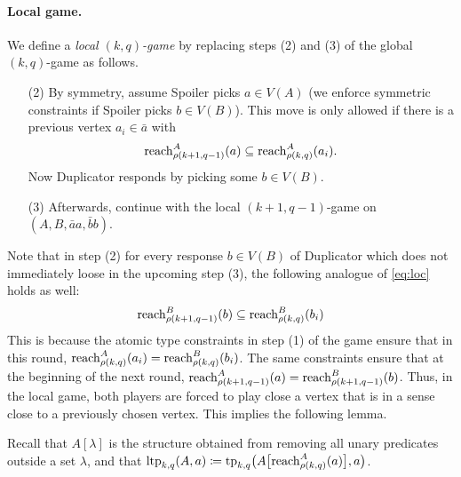 \paragraph{Local game.}
We define a \emph{local \((k,q)\)-game} by replacing steps (2) and (3) of the global \((k,q)\)-game as follows.
\begin{itemize}
    \item [(2)]\label{l:step2}
        By symmetry, assume Spoiler picks \(a \in V(A)\) (we enforce symmetric constraints if Spoiler picks \(b \in V(B)\)).
        This move is only allowed if there is a previous vertex \(a_i \in \bar a\) 
        with
        \begin{align}\label{eq:loc}%
            \reach^A_{\rho(k+1,q-1)}(a) \subseteq \reach^A_{\rho(k,q)}(a_i).    
        \end{align}
        Now Duplicator responds by picking some $b\in V(B)$.

        

        \item[(3)]\label{l:step3} Afterwards, continue with the local \((k+1,q-1)\)-game on \((A,B,\bar a a,\bar b b)\).
\end{itemize}
Note that in step (2)
for every response \(b\in V(B)\) of Duplicator which does not immediately loose in the upcoming step (3),
        the following analogue of \eqref{eq:loc} holds as well:
        \[
            {\rm reach}^B_{\rho(k+1,q-1)}(b) \subseteq {\rm reach}^B_{\rho(k,q)}(b_i)
        \]
        This is because
        the atomic type constraints in step (1) of the game ensure that in this round, \({\rm reach}^A_{\rho(k,q)}(a_i) = {\rm reach}^B_{\rho(k,q)}(b_i)\).
        The same constraints ensure that at the beginning of the next round, \({\rm reach}^A_{\rho(k+1,q-1)}(a) = {\rm reach}^B_{\rho(k+1,q-1)}(b)\).
        Thus, in the local game, both players are forced to play close a vertex that is in a sense close to a previously chosen vertex.
        This implies the following lemma.

        \medskip
Recall that \(A[\lambda]\) is the structure obtained from removing all unary predicates outside a set \(\lambda\),
and that \(\textnormal{ltp}_{k,q}(A,a) \coloneqq  \textnormal{tp}_{k,q}\bigl(A\bigl[{\rm reach}^A_{\rho(k,q)}(a)\bigr],a\bigr)\).


